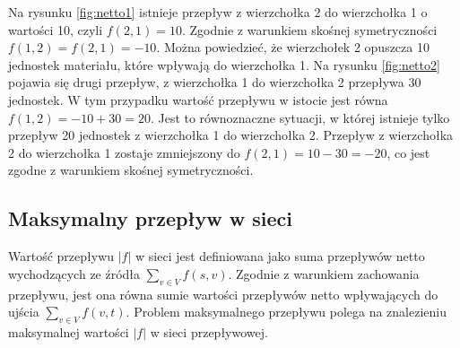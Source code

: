 Na rysunku \ref{fig:netto1} istnieje przepływ z wierzchołka 2 do wierzchołka 1 o wartości 10, czyli $ f(2, 1) = 10 $. Zgodnie z warunkiem skośnej symetryczności $ f(1, 2) = f(2, 1) = -10 $. Można powiedzieć, że wierzchołek 2 opuszcza 10 jednostek materiału, które wpływają do wierzchołka 1. Na rysunku \ref{fig:netto2} pojawia się drugi przepływ, z wierzchołka 1 do wierzchołka 2 przepływa 30 jednostek. W tym przypadku wartość przepływu w istocie jest równa $ f(1,2)=-10 + 30=20 $. Jest to równoznaczne sytuacji, w której istnieje tylko przepływ 20 jednostek z wierzchołka 1 do wierzchołka 2. Przepływ z wierzchołka 2 do wierzchołka 1 zostaje zmniejszony do $ f(2, 1)=10-30=-20 $, co jest zgodne z warunkiem skośnej symetryczności.\cite{id:ZaawansowaneAlgorytmySiecPrzeplyw}
\subsection{Maksymalny przepływ w sieci}
Wartość przepływu $ |f| $ w sieci jest definiowana jako suma przepływów netto wychodzących ze źródła $ \sum_{v\in V}{f(s, v)} $. Zgodnie z warunkiem zachowania przepływu, jest ona równa sumie wartości przepływów netto wpływających do ujścia $ \sum_{v\in V}{f(v, t)} $. Problem maksymalnego przepływu polega na znalezieniu maksymalnej wartości $ |f| $ w sieci przepływowej.\cite{id:ZaawansowaneAlgorytmySiecPrzeplyw}
